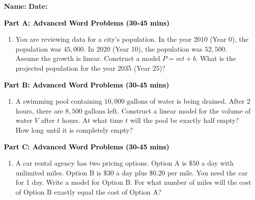 \documentclass[12pt, letterpaper, fleqn]{article}
\begin{document}
\textbf{Name:} \underline{\hspace{5cm}}
\hfill
\textbf{Date:} \underline{\hspace{3cm}}\\


\begin{tcolorbox}[colback=customteal!20]
\large\textcolor{black}{\textbf{Part A: Advanced Word Problems (30-45 mins)}}
\end{tcolorbox}

\vspace{3mm}

\begin{enumerate}[itemsep=5.5cm, leftmargin=0.6cm]
\item You are reviewing data for a city's population. In the year 2010 (Year 0), the population was $45,000$. In 2020 (Year 10), the population was $52,500$. Assume the growth is linear. Construct a model $P = mt + b$. What is the projected population for the year 2035 (Year 25)?
\end{enumerate}

\newpage

\begin{tcolorbox}[colback=customteal!20]
\large\textcolor{black}{\textbf{Part B: Advanced Word Problems (30-45 mins)}}
\end{tcolorbox}

\vspace{3mm}

\begin{enumerate}[itemsep=5.5cm, leftmargin=0.6cm, resume]
\item A swimming pool containing $10,000\text{ gallons}$ of water is being drained. After 2 hours, there are $8,500\text{ gallons}$ left. Construct a linear model for the volume of water $V$ after $t$ hours. At what time $t$ will the pool be exactly half empty? How long until it is completely empty?
\end{enumerate}

\newpage

\begin{tcolorbox}[colback=customteal!20]
\large\textcolor{black}{\textbf{Part C: Advanced Word Problems (30-45 mins)}}
\end{tcolorbox}

\vspace{3mm}

\begin{enumerate}[itemsep=5.5cm, leftmargin=0.6cm, resume]
\item A car rental agency has two pricing options. Option A is $\$50$ a day with unlimited miles. Option B is $\$30$ a day plus $\$0.20$ per mile. You need the car for 1 day. Write a model for Option B. For what number of miles will the cost of Option B exactly equal the cost of Option A?
\end{enumerate}
\end{document}
